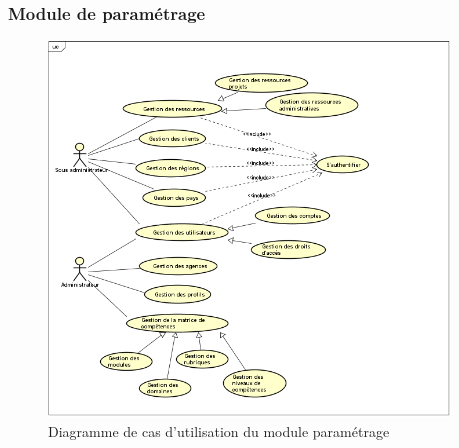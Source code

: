 \subsubsection{Module de paramétrage}
\begin{figure}[h!]  
  \centering
    \includegraphics[width=0.95\textwidth]{chapitre2/Figures/parametrageUC.png}
  \caption{Diagramme de cas d’utilisation du module paramétrage}
\end{figure}
\newpage
